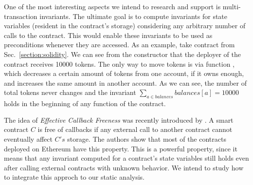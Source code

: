 One of the most interesting aspects we intend to research and support is
multi-transaction invariants.
%
The ultimate goal is to compute invariants for state variables (resident in the
contract's storage) considering any arbitrary number of calls to the contract.
%
This would enable these invariants to be used as preconditions whenever they
are accessed.
%
As an example, take contract  from Sec.~\ref{section:solidity}.
%
We can see from the constructor that the deployer of the contract receives
10000 tokens.
%
The only way to move tokens is via function , which decreases a
certain amount of tokens from one account, if it owns enough, and increases the
same amount in another account.
%
As we can see, the number of total tokens never changes and the invariant
$\sum_{a \in balances} balances[a] = 10000$ holds in the beginning of any
function of the contract.

The idea of \emph{Effective Callback Freeness} was recently introduced by
\cite{Grossman}.
%
A smart contract $C$ is free of callbacks if any external call to another
contract cannot eventually affect $C's$ storage.
%
The authors show that most of the contracts deployed on Ethereum have this
property.
%
This is a powerful property, since it means that any invariant computed for a
contract's state variables still holds even after calling external contracts
with unknown behavior.
%
We intend to study how to integrate this approch to our static analysis.
